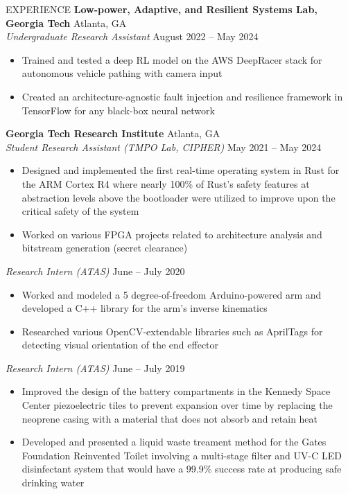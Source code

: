 \documentclass{resume} %
\begin{document}
\vspace{-0.8em}
\begin{rSection}{EXPERIENCE}
\textbf{Low-power, Adaptive, and Resilient Systems Lab, Georgia Tech} \hfill Atlanta, GA\\
\textit{Undergraduate Research Assistant} \hfill August 2022 -- May 2024
\vspace{-0.5em}
   \begin{itemize}
      \itemsep -5pt {} 
      \item Trained and tested a deep RL model on the AWS DeepRacer stack for autonomous vehicle pathing with camera input
      \item Created an architecture-agnostic fault injection and resilience framework in TensorFlow
      for any black-box neural network
   \end{itemize}
\vspace{-0.5em}
\textbf{Georgia Tech Research Institute} \hfill Atlanta, GA\\
\textit{Student Research Assistant (TMPO Lab, CIPHER)} \hfill May 2021 -- May 2024
\vspace{-0.5em}
 \begin{itemize}
    \itemsep -5pt {} 
     \item Designed and implemented the first real-time operating system in Rust for the ARM Cortex R4 where
     nearly 100\% of Rust's safety features at abstraction levels above the bootloader were utilized to improve
     upon the critical safety of the system
     \item Worked on various FPGA projects related to architecture analysis and bitstream generation (secret clearance)
 \end{itemize}
\vspace{-0.5em}
\textit{Research Intern (ATAS)} \hfill June -- July 2020
\vspace{-0.5em}
 \begin{itemize}
    \itemsep -5pt {} 
     \item Worked and modeled a 5 degree-of-freedom Arduino-powered arm and
     developed a C++ library for the arm's inverse kinematics
     \item Researched various OpenCV-extendable libraries such as AprilTags for detecting visual orientation of the end effector
 \end{itemize}
\vspace{-0.5em}
\textit{Research Intern (ATAS)} \hfill June -- July 2019
\vspace{-0.5em}
 \begin{itemize}
    \itemsep -5pt {} 
     \item Improved the design of the battery compartments in the Kennedy Space Center piezoelectric tiles
     to prevent expansion over time by replacing the neoprene casing with a material that does not absorb and retain
     heat
     \item Developed and presented a liquid waste treament method for the Gates Foundation Reinvented Toilet
     involving a multi-stage filter and UV-C LED disinfectant system that would have a 99.9\% success rate
     at producing safe drinking water
 \end{itemize}
\end{rSection} 
\end{document}
